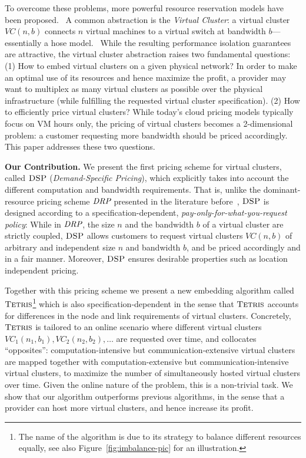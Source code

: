 \documentclass{sig-alternate-per}
\newcommand{\ALG}{\textsc{Tetris}}
\newcommand{\pricing}{\textsc{DSP}}
\begin{document}
To overcome these problems, more powerful resource reservation models have been proposed.~\cite{short-ballani2011towards}
A common abstraction is the \emph{Virtual Cluster}: a virtual cluster $VC(n,b)$ connects
$n$ virtual machines to a virtual switch at bandwidth $b$---essentially a hose model.~\cite{short-talk-about}
While the resulting performance isolation guarantees are attractive, the virtual cluster abstraction
raises two fundamental questions: (1) How to embed virtual clusters on a given physical network? In order to
make an optimal use of its resources and hence maximize the profit, a provider may want to multiplex as
many virtual clusters as possible over the physical infrastructure (while fulfilling the requested virtual
cluster specification). (2) How to efficiently price virtual clusters?
While today's cloud pricing models typically focus on VM hours only, the pricing of virtual clusters becomes
a 2-dimensional problem: a customer requesting more bandwidth should be priced accordingly.
This paper addresses these two questions.

\textbf{Our Contribution.} We present the first pricing scheme for virtual clusters, called $\pricing$ (\emph{Demand-Specific Pricing}),
which explicitly takes into account the different computation and bandwidth requirements. That is, unlike
the dominant-resource pricing scheme $\emph{DRP}$ presented in the literature before~\cite{short-ballani2011price},
$\pricing$ is designed according to a specification-dependent, \emph{pay-only-for-what-you-request policy}:
While in $\emph{DRP}$, the size $n$ and the bandwidth $b$ of a virtual cluster are strictly coupled,
$\pricing$ allows customers to request virtual clusters $VC(n,b)$ of
arbitrary and independent size $n$ and bandwidth $b$, and be priced accordingly and in a fair manner.
Moreover, $\pricing$ ensures desirable properties such as location independent pricing.

Together with this pricing scheme we present a new embedding algorithm called $\ALG$\footnote{The
name of the algorithm is due to its strategy to balance different resources equally, see also Figure~\ref{fig:imbalance-pic}
for an illustration.} which
is also specification-dependent in the sense that $\ALG$ accounts for differences in the node and link requirements of virtual clusters.
Concretely, $\ALG$ is tailored to an online scenario where different virtual clusters $VC_1(n_1,b_1),VC_2(n_2,b_2),\ldots$ are
requested over time, and collocates ``opposites'': computation-intensive but
communication-extensive virtual clusters are mapped together with
computation-extensive but communication-intensive virtual clusters, to maximize the number of simultaneously hosted
virtual clusters over time.
Given the online nature of the problem, this is a non-trivial task.
We show that our algorithm outperforms previous algorithms, in the sense that
a provider can host more virtual clusters, and hence increase its profit.
\end{document}
